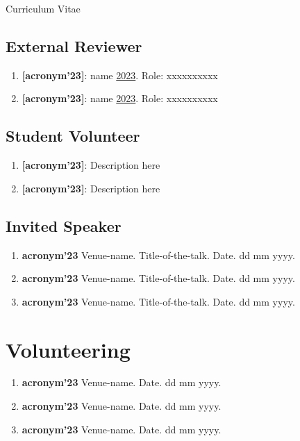 \documentclass[11pt,a4paper]{article}
\begin{document}
\begin{cv}{Curriculum Vitae}
\subsection{External Reviewer}
\begin{cvlist}{}
\item \begin{enumerate}[leftmargin=-2cm]
        \item \textbf{[acronym'23]}: name  \href{about:blank}{2023}. Role: xxxxxxxxxx
        \item \textbf{[acronym'23]}: name  \href{about:blank}{2023}. Role: xxxxxxxxxx
    \end{enumerate}
\end{cvlist}
\subsection{Student Volunteer}
\begin{cvlist}{}
\item \begin{enumerate}[leftmargin=-2cm]
        \item \textbf{[acronym'23]}: Description here
        \item \textbf{[acronym'23]}: Description here
\end{enumerate}

\end{cvlist}
\subsection{Invited Speaker}
\begin{enumerate}%
    \item \textbf{acronym'23} Venue-name. Title-of-the-talk. Date. dd mm yyyy.
    \item \textbf{acronym'23} Venue-name. Title-of-the-talk. Date. dd mm yyyy.
    \item \textbf{acronym'23} Venue-name. Title-of-the-talk. Date. dd mm yyyy.

\end{enumerate}

\section{Volunteering}
\begin{enumerate}%
    \item \textbf{acronym'23} Venue-name. Date. dd mm yyyy.
    \item \textbf{acronym'23} Venue-name. Date. dd mm yyyy.
    \item \textbf{acronym'23} Venue-name. Date. dd mm yyyy.
\end{enumerate}


\end{cv}
\end{document}
